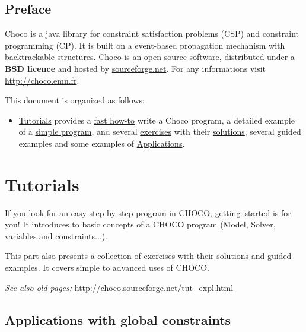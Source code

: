 \chapter*{Preface}
Choco is a java library for constraint satisfaction problems (CSP) and constraint programming (CP). It is built on a event-based propagation mechanism with backtrackable structures.
Choco is an open-source software, distributed under a \textbf{BSD licence} and hosted by \href{http://sourceforge.net/projects/choco/}{sourceforge.net}.
For any informations visit \url{http://choco.emn.fr}.
\bigskip

\noindent This document is organized as follows:
\begin{itemize}
\item \hyperlink{ch:tut}{Tutorials} provides a \hyperlink{gettingstarted:gettingstarted:welcometochoco}{fast how-to} write a Choco program, a detailed example of a \hyperlink{gettingstarted:firstexample:magicsquare}{simple program}, and several \hyperlink{exercises}{exercises} with their \hyperlink{solutions}{solutions},  several guided examples  and some examples of \hyperlink{doc:applications}{Applications}.
\end{itemize}

\part{Tutorials}\label{ch:tut}\hypertarget{ch:tut}{}
If you look for an easy step-by-step program in CHOCO, \hyperlink{gettingstarted}{getting\ started} is for you! It introduces to basic concepts of a CHOCO program (Model, Solver, variables and constraints...).

This part also presents a collection of \hyperlink{exercises}{exercises} with their \hyperlink{solutions}{solutions} and guided examples. It covers simple to advanced uses of CHOCO.

\emph{See also old pages:} \url{http://choco.sourceforge.net/tut\_expl.html}





\chapter{Applications with global constraints}\label{doc:applications}\hypertarget{doc:applications}{}

